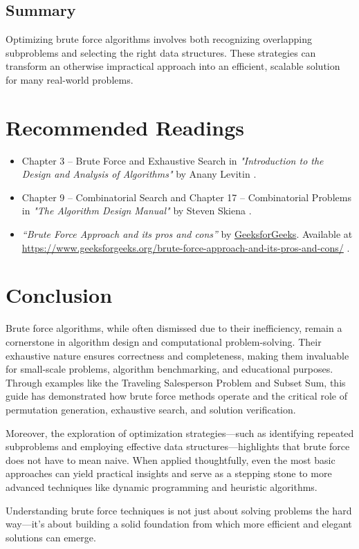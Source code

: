 \documentclass[12pt]{article}
\begin{document}
    \subsection{Summary}
    Optimizing brute force algorithms involves both recognizing overlapping subproblems and selecting the right data structures. These strategies can transform an otherwise impractical approach into an efficient, scalable solution for many real-world problems.

    \section{Recommended Readings}
        \begin{itemize}
            \item Chapter 3 – Brute Force and Exhaustive Search in \textit{"Introduction to the Design and Analysis of Algorithms"} by Anany Levitin \cite{Levitin2012}.
            \item Chapter 9 – Combinatorial Search and Chapter 17 – Combinatorial Problems in \textit{"The Algorithm Design Manual"} by Steven Skiena \cite{skiena2020algorithm}.
            \item \textit{``Brute Force Approach and its pros and cons''} by \href{https://www.geeksforgeeks.org/}{GeeksforGeeks}.  Available at \url{https://www.geeksforgeeks.org/brute-force-approach-and-its-pros-and-cons/} \cite{geeksforgeeks_brute_force}.
        \end{itemize}

    \section*{Conclusion}
    Brute force algorithms, while often dismissed due to their inefficiency, remain a cornerstone in algorithm design and computational problem-solving. Their exhaustive nature ensures correctness and completeness, making them invaluable for small-scale problems, algorithm benchmarking, and educational purposes. Through examples like the Traveling Salesperson Problem and Subset Sum, this guide has demonstrated how brute force methods operate and the critical role of permutation generation, exhaustive search, and solution verification.

    Moreover, the exploration of optimization strategies—such as identifying repeated subproblems and employing effective data structures—highlights that brute force does not have to mean naive. When applied thoughtfully, even the most basic approaches can yield practical insights and serve as a stepping stone to more advanced techniques like dynamic programming and heuristic algorithms.

    Understanding brute force techniques is not just about solving problems the hard way—it's about building a solid foundation from which more efficient and elegant solutions can emerge.

    
\end{document}
